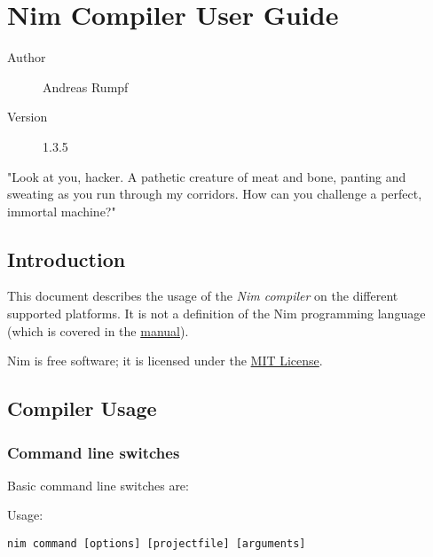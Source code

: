 \hypertarget{nim-compiler-user-guide}{%
\section{Nim Compiler User Guide}\label{nim-compiler-user-guide}}

\begin{description}
\item[Author]
Andreas Rumpf
\item[Version]
1.3.5
\end{description}

"Look at you, hacker. A pathetic creature of meat and bone, panting and
sweating as you run through my corridors. How can you challenge a
perfect, immortal machine?"

\hypertarget{introduction}{%
\subsection{Introduction}\label{introduction}}

This document describes the usage of the \emph{Nim compiler} on the
different supported platforms. It is not a definition of the Nim
programming language (which is covered in the
\href{manual.html}{manual}).

Nim is free software; it is licensed under the
\href{http://www.opensource.org/licenses/mit-license.php}{MIT License}.

\hypertarget{compiler-usage}{%
\subsection{Compiler Usage}\label{compiler-usage}}

\hypertarget{command-line-switches}{%
\subsubsection{Command line switches}\label{command-line-switches}}

Basic command line switches are:

Usage:

\begin{verbatim}
nim command [options] [projectfile] [arguments]
\end{verbatim}

